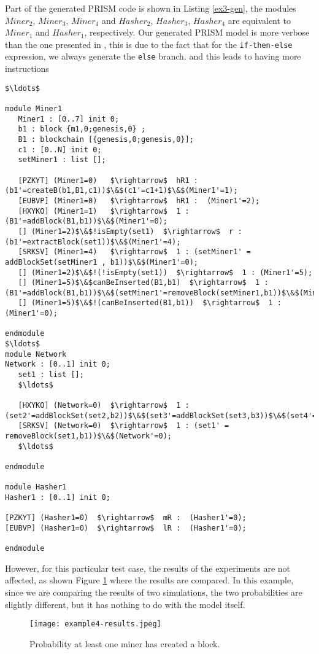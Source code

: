 Part of the generated PRISM code is shown in Listing \ref{ex3-gen}, 
the modules $Miner_2$, $Miner_3$, $Miner_4$ and $Hasher_2$, $Hasher_3$, $Hasher_4$ are equivalent to $Miner_1$ and $Hasher_1$, respectively.
Our generated PRISM model is more verbose than the one presented in \cite{DBLP:journals/concurrency/BistarelliNGLMV23},
this is due to the fact that for the \texttt{if-then-else} expression, we always generate the \texttt{else} branch.
and this leads to having more instructions
\begin{lstlisting}[style=prism-color,caption={Generated PRISM program for the Peer-To-Peer Protocol.},captionpos=b,label={ex3-gen}]
$\ldots$

module Miner1
   Miner1 : [0..7] init 0;
   b1 : block {m1,0;genesis,0} ; 
   B1 : blockchain [{genesis,0;genesis,0}]; 
   c1 : [0..N] init 0; 
   setMiner1 : list []; 

   [PZKYT] (Miner1=0)   $\rightarrow$  hR1 : (b1'=createB(b1,B1,c1))$\&$(c1'=c1+1)$\&$(Miner1'=1); 
   [EUBVP] (Miner1=0)   $\rightarrow$  hR1 :  (Miner1'=2); 
   [HXYKO] (Miner1=1)   $\rightarrow$  1 : (B1'=addBlock(B1,b1))$\&$(Miner1'=0); 
   [] (Miner1=2)$\&$!isEmpty(set1)  $\rightarrow$  r : (b1'=extractBlock(set1))$\&$(Miner1'=4); 
   [SRKSV] (Miner1=4)   $\rightarrow$  1 : (setMiner1' = addBlockSet(setMiner1 , b1))$\&$(Miner1'=0); 
   [] (Miner1=2)$\&$!(!isEmpty(set1))  $\rightarrow$  1 : (Miner1'=5); 
   [] (Miner1=5)$\&$canBeInserted(B1,b1)  $\rightarrow$  1 : (B1'=addBlock(B1,b1))$\&$(setMiner1'=removeBlock(setMiner1,b1))$\&$(Miner1'=0); 
   [] (Miner1=5)$\&$!(canBeInserted(B1,b1))  $\rightarrow$  1 : (Miner1'=0);

endmodule
$\ldots$
module Network
Network : [0..1] init 0;
   set1 : list []; 
   $\ldots$

   [HXYKO] (Network=0)  $\rightarrow$  1 : (set2'=addBlockSet(set2,b2))$\&$(set3'=addBlockSet(set3,b3))$\&$(set4'=addBlockSet(set4,b4))$\&$(Network'=0); 
   [SRKSV] (Network=0)  $\rightarrow$  1 : (set1' = removeBlock(set1,b1))$\&$(Network'=0); 
   $\ldots$

endmodule

module Hasher1
Hasher1 : [0..1] init 0;

[PZKYT] (Hasher1=0)  $\rightarrow$  mR :  (Hasher1'=0); 
[EUBVP] (Hasher1=0)  $\rightarrow$  lR :  (Hasher1'=0); 

endmodule
\end{lstlisting}

However, for this particular test case, the results of the experiments are not affected, 
as shown Figure \ref{ex3-res} where the results are compared.
In this example, since we are comparing the results of two simulations, the two probabilities are
slightly different, but it has nothing to do with the model itself.
\begin{figure}[h]
\centering
\texttt{[image: example4-results.jpeg]}	
\caption{Probability at least one miner has created a block.}
\label{ex3-res}
\end{figure}


